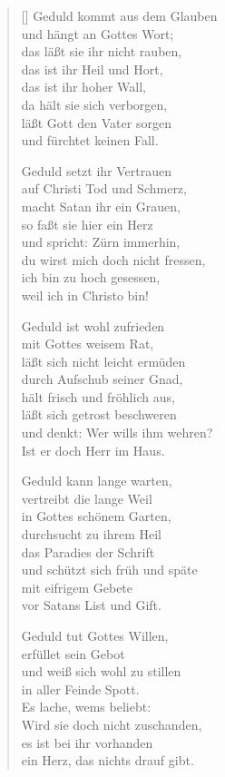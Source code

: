 \begin{multicols}{2}
\begin{verse}[\versewidth]
 Geduld kommt aus dem Glauben\\
und hängt an Gottes Wort;\\
das läßt sie ihr nicht rauben,\\
das ist ihr Heil und Hort,\\
das ist ihr hoher Wall,\\
da hält sie sich verborgen,\\
läßt Gott den Vater sorgen\\
und fürchtet keinen Fall.

 Geduld setzt ihr Vertrauen\\
auf Christi Tod und Schmerz,\\
macht Satan ihr ein Grauen,\\
so faßt sie hier ein Herz\\
und spricht: Zürn immerhin,\\
du wirst mich doch nicht fressen,\\
ich bin zu hoch gesessen,\\
weil ich in Christo bin!

 Geduld ist wohl zufrieden\\
mit Gottes weisem Rat,\\
läßt sich nicht leicht ermüden\\
durch Aufschub seiner Gnad,\\
hält frisch und fröhlich aus,\\
läßt sich getrost beschweren\\
und denkt: Wer wills ihm wehren?\\
Ist er doch Herr im Haus.

 Geduld kann lange warten,\\
vertreibt die lange Weil\\
in Gottes schönem Garten,\\
durchsucht zu ihrem Heil\\
das Paradies der Schrift\\
und schützt sich früh und späte\\
mit eifrigem Gebete\\
vor Satans List und Gift.

 Geduld tut Gottes Willen,\\
erfüllet sein Gebot\\
und weiß sich wohl zu stillen\\
in aller Feinde Spott.\\
Es lache, wems beliebt:\\
Wird sie doch nicht zuschanden,\\
es ist bei ihr vorhanden\\
ein Herz, das nichts drauf gibt.


\end{verse}
\end{multicols}
